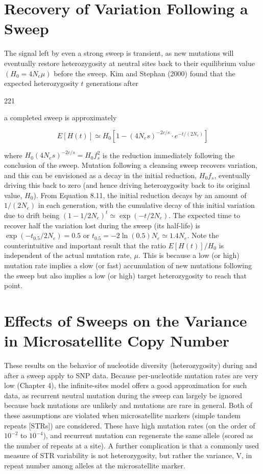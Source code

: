 \documentclass{article}
\begin{document}
\section{Recovery of Variation Following a Sweep}
The signal left by even a strong sweep is transient, as new mutations will eventually restore heterozygosity at neutral sites back to their equilibrium value  $ (H_0 = 4N_e\mu) $ before the sweep. Kim and Stephan (2000) found that the expected heterozygosity  $ t $ generations after

221

a completed sweep is approximately

\begin{equation}
E[H(t)]\simeq H_{0}\left[1-(4N_{e}s)^{-2c/s}\cdot e^{-t/(2N_{e})}\right]
\tag{8.11}
\label{eq:8_11}
\end{equation}

where  $ H_0(4N_e s)^{-2c/s} = H_0 f_s^2 $ is the reduction immediately following the conclusion of the sweep. Mutation following a cleansing sweep recovers variation, and this can be envisioned as a decay in the initial reduction,  $ H_0 f_s $, eventually driving this back to zero (and hence driving heterozygosity back to its original value,  $ H_0 $). From Equation 8.11, the initial reduction decays by an amount of  $ 1/(2N_e) $ in each generation, with the cumulative decay of this initial variation due to drift being  $ (1 - 1/2N_e)^t \simeq \exp(-t/2N_e) $. The expected time to recover half the variation lost during the sweep (its half-life) is  $ \exp(-t_{0.5}/2N_e) = 0.5 $ or  $ t_{0.5} = -2 \ln(0.5) N_e \simeq 1.4 N_e $. Note the counterintuitive and important result that the ratio  $ E[H(t)]/H_0 $ is independent of the actual mutation rate,  $ \mu $. This is because a low (or high) mutation rate implies a slow (or fast) accumulation of new mutations following the sweep but also implies a low (or high) target heterozygosity to reach that point.

\section{Effects of Sweeps on the Variance in Microsatellite Copy Number}
These results on the behavior of nucleotide diversity (heterozygosity) during and after a sweep apply to SNP data. Because per-nucleotide mutation rates are very low (Chapter 4), the infinite-sites model offers a good approximation for such data, as recurrent neutral mutation during the sweep can largely be ignored because back mutations are unlikely and mutations are rare in general. Both of these assumptions are violated when microsatellite markers (simple tandem repeats [STRs]) are considered. These have high mutation rates (on the order of  $ 10^{-2} $ to  $ 10^{-4} $), and recurrent mutation can regenerate the same allele (scored as the number of repeats at a site). A further complication is that a commonly used measure of STR variability is not heterozygosity, but rather the variance, V, in repeat number among alleles at the microsatellite marker.
\end{document}
